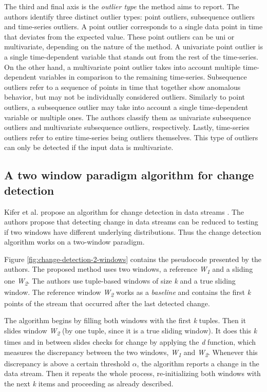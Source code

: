 The third and final axis is the \textit{outlier type} the method aims to report. The authors identify three distinct outlier types: point outliers, subsequence outliers and time-series outliers. A point outlier corresponds to a single data point in time that deviates from the expected value. These point outliers can be uni or multivariate, depending on the nature of the method. A univariate point outlier is a single time-dependent variable that stands out from the rest of the time-series. On the other hand, a multivariate point outlier takes into account multiple time-dependent variables in comparison to the remaining time-series. Subsequence outliers refer to a sequence of points in time that together show anomalous behavior, but may not be individually considered outliers. Similarly to point outliers, a subsequence outlier may take into account a single time-dependent variable or multiple ones. The authors classify them as univariate subsequence outliers and multivariate subsequence outliers, respectively. Lastly, time-series outliers refer to entire time-series being outliers themselves. This type of outliers can only be detected if the input data is multivariate.


\subsection{A two window paradigm algorithm for change detection}
\label{subsec:2-window} 

Kifer et al. propose an algorithm for change detection in data streams \cite{Kifer-Detecting-Change}. The authors propose that detecting change in data streams can be reduced to testing if two windows have different underlying distributions. Thus the change detection algorithm works on a two-window paradigm.

Figure \ref{fig:change-detection-2-windows} contains the pseudocode presented by the authors. The proposed method uses two windows, a reference \textit{W\textsubscript{1}} and a sliding one \textit{W\textsubscript{2}}. The authors use tuple-based windows of size \textit{k} and a true sliding window. The reference window \textit{W\textsubscript{2}} works as a \textit{baseline} and contains the first \textit{k} points of the stream that occurred after the last detected change.

The algorithm begins by filling both windows with the first \textit{k} tuples. Then it slides window \textit{W\textsubscript{2}} (by one tuple, since it is a true sliding window). It does this \textit{k} times and in between slides checks for change by applying the \textit{d} function, which measures the discrepancy between the two windows, \textit{W\textsubscript{1}} and \textit{W\textsubscript{2}}. Whenever this discrepancy is above a certain threshold $\alpha$, the algorithm reports a change in the data stream. Then it repeats the whole process, re-initializing both windows with the next \textit{k} items and proceeding as already described. 

